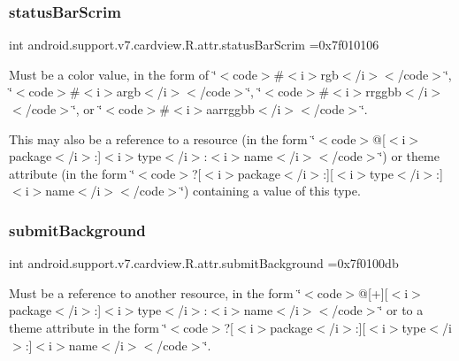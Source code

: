 \subsubsection{\texorpdfstring{status\+Bar\+Scrim}{statusBarScrim}}
{\footnotesize\ttfamily int android.\+support.\+v7.\+cardview.\+R.\+attr.\+status\+Bar\+Scrim =0x7f010106\hspace{0.3cm}{\ttfamily [static]}}

Must be a color value, in the form of \char`\"{}$<$code$>$\#$<$i$>$rgb$<$/i$>$$<$/code$>$\char`\"{}, \char`\"{}$<$code$>$\#$<$i$>$argb$<$/i$>$$<$/code$>$\char`\"{}, \char`\"{}$<$code$>$\#$<$i$>$rrggbb$<$/i$>$$<$/code$>$\char`\"{}, or \char`\"{}$<$code$>$\#$<$i$>$aarrggbb$<$/i$>$$<$/code$>$\char`\"{}. 

This may also be a reference to a resource (in the form \char`\"{}$<$code$>$@\mbox{[}$<$i$>$package$<$/i$>$\+:\mbox{]}$<$i$>$type$<$/i$>$\+:$<$i$>$name$<$/i$>$$<$/code$>$\char`\"{}) or theme attribute (in the form \char`\"{}$<$code$>$?\mbox{[}$<$i$>$package$<$/i$>$\+:\mbox{]}\mbox{[}$<$i$>$type$<$/i$>$\+:\mbox{]}$<$i$>$name$<$/i$>$$<$/code$>$\char`\"{}) containing a value of this type. \mbox{\label{classandroid_1_1support_1_1v7_1_1cardview_1_1R_1_1attr_ad1f2599c7421633a092dd0dc4f166d8a}} 
\subsubsection{\texorpdfstring{submit\+Background}{submitBackground}}
{\footnotesize\ttfamily int android.\+support.\+v7.\+cardview.\+R.\+attr.\+submit\+Background =0x7f0100db\hspace{0.3cm}{\ttfamily [static]}}

Must be a reference to another resource, in the form \char`\"{}$<$code$>$@\mbox{[}+\mbox{]}\mbox{[}$<$i$>$package$<$/i$>$\+:\mbox{]}$<$i$>$type$<$/i$>$\+:$<$i$>$name$<$/i$>$$<$/code$>$\char`\"{} or to a theme attribute in the form \char`\"{}$<$code$>$?\mbox{[}$<$i$>$package$<$/i$>$\+:\mbox{]}\mbox{[}$<$i$>$type$<$/i$>$\+:\mbox{]}$<$i$>$name$<$/i$>$$<$/code$>$\char`\"{}. \mbox{\label{classandroid_1_1support_1_1v7_1_1cardview_1_1R_1_1attr_a05ab66196223ffd287bd23667d4122cd}} 
